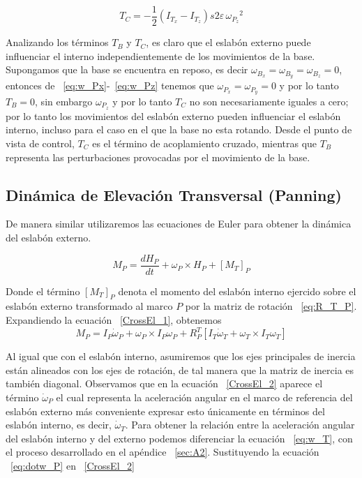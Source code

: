 \begin{equation}
T_C=-\frac{1}{2}\left(I_{T_x}-I_{T_z}\right)s2\varepsilon \, {\omega _{P_z}}^2 
\end{equation}

Analizando los t\'{e}rminos $T_B$ y $T_C$, es claro que el eslab\'{o}n externo puede influenciar el interno independientemente de los movimientos de la base. Supongamos que la base se encuentra en reposo, es decir $\omega _{B_x}=\omega _{B_y}=\omega _{B_z}=0$, entonces de ~\ref{eq:w_Px}-~\ref{eq:w_Pz} tenemos que $\omega _{P_x}=\omega _{P_y}=0$ y por lo tanto $T_B=0$, sin embargo $\omega _{P_z}$ y por lo tanto $T_C$ no son necesariamente iguales a cero; por lo tanto los movimientos del eslab\'{o}n externo pueden influenciar el eslab\'{o}n interno, incluso para el caso en el que la base no esta rotando. Desde el punto de vista de control, $T_C$ es el t\'{e}rmino de acoplamiento cruzado, mientras que $T_B$ representa las perturbaciones provocadas por el movimiento de la base.  

\subsection{Din\'{a}mica de Elevaci\'{o}n Transversal (Panning)} \label{sec:Din_cross}

De manera similar utilizaremos las ecuaciones de Euler para obtener la din\'{a}mica del eslab\'{o}n externo. 

\begin{equation}
M_P=\frac{d H_P}{dt}+ \omega_P \times H_P + \left[ M_T \right]_P
\label{CrossEl_1}
\end{equation}

Donde el t\'{e}rmino $\left[ M_T \right]_P$ denota el momento del eslab\'{o}n interno ejercido sobre el eslab\'{o}n externo transformado al marco $P$ por la matriz de rotaci\'{o}n ~\ref{eq:R_T_P}. Expandiendo la ecuaci\'{o}n ~\ref{CrossEl_1}, obtenemos
\begin{equation}
M_P=I_{P}\dot{\omega}_{P}+ \omega_P \times I_{P}\omega_P + R_{P}^{T} \left[  I_{T}\dot{\omega}_{T} + \omega _{T} \times I_{T}\omega_T \right]
\label{CrossEl_2}
\end{equation}

Al igual que con el eslab\'{o}n interno, asumiremos que los ejes principales de inercia est\'{a}n alineados con los ejes de rotaci\'{o}n, de tal manera que la matriz de inercia es tambi\'{e}n diagonal. Observamos que en la ecuaci\'{o}n ~\ref{CrossEl_2} aparece el t\'{e}rmino $\dot{\omega}_{P}$ el cual representa la aceleraci\'{o}n angular en el marco de referencia del eslab\'{o}n externo m\'{a}s conveniente expresar esto \'{u}nicamente en t\'{e}rminos del eslab\'{o}n interno, es decir, $\dot{\omega}_{T}$. Para obtener la relaci\'{o}n entre la aceleraci\'{o}n angular del eslab\'{o}n interno y del externo podemos diferenciar la ecuaci\'{o}n ~\ref{eq:w_T}, con el proceso desarrollado en el ap\'{e}ndice ~\ref{sec:A2}. Sustituyendo la ecuaci\'{o}n ~\ref{eq:dotw_P} en ~\ref{CrossEl_2}

